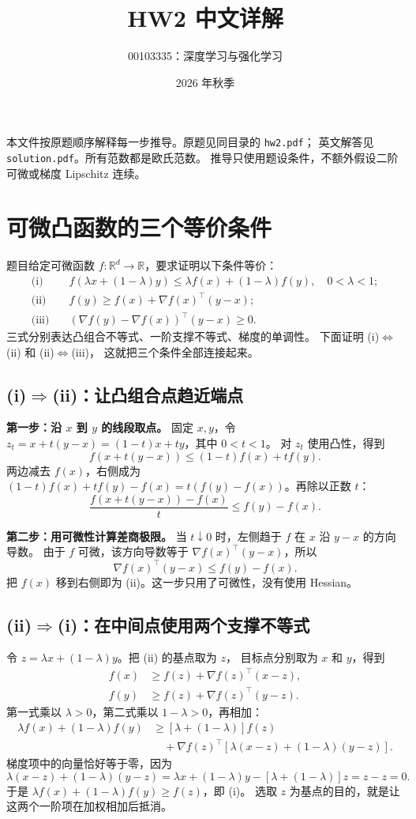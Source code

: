 \documentclass[UTF8,a4paper,11pt,fontset=fandol]{ctexart}
\title{HW2 中文详解}
\author{00103335：深度学习与强化学习}
\date{2026 年秋季}
\newcommand{\R}{\mathbb R}
\begin{document}
\pagestyle{plain}
\maketitle
本文件按原题顺序解释每一步推导。原题见同目录的 \texttt{hw2.pdf}；
英文解答见 \texttt{solution.pdf}。所有范数都是欧氏范数。
推导只使用题设条件，不额外假设二阶可微或梯度 Lipschitz 连续。

\section{可微凸函数的三个等价条件}
题目给定可微函数 $f:\R^d\to\R$，要求证明以下条件等价：
\begin{align*}
 \text{(i)}\quad&f(\lambda x+(1-\lambda)y)
 \leq\lambda f(x)+(1-\lambda)f(y),\quad0<\lambda<1;\\
 \text{(ii)}\quad&f(y)\geq f(x)+\nabla f(x)^\top(y-x);\\
 \text{(iii)}\quad&(\nabla f(y)-\nabla f(x))^\top(y-x)\geq0.
\end{align*}
三式分别表达凸组合不等式、一阶支撑不等式、梯度的单调性。
下面证明 (i)$\Leftrightarrow$(ii) 和 (ii)$\Leftrightarrow$(iii)，
这就把三个条件全部连接起来。

\subsection*{(i)$\Rightarrow$(ii)：让凸组合点趋近端点}
\textbf{第一步：沿 $x$ 到 $y$ 的线段取点。}
固定 $x,y$，令 $z_t=x+t(y-x)=(1-t)x+ty$，其中 $0<t<1$。
对 $z_t$ 使用凸性，得到
\[
 f(x+t(y-x))\leq(1-t)f(x)+tf(y).
\]
两边减去 $f(x)$，右侧成为
$(1-t)f(x)+tf(y)-f(x)=t(f(y)-f(x))$。再除以正数 $t$：
\[
 \frac{f(x+t(y-x))-f(x)}t\leq f(y)-f(x).
\]

\textbf{第二步：用可微性计算差商极限。}
当 $t\downarrow0$ 时，左侧趋于 $f$ 在 $x$ 沿 $y-x$ 的方向导数。
由于 $f$ 可微，该方向导数等于 $\nabla f(x)^\top(y-x)$，所以
\[
 \nabla f(x)^\top(y-x)\leq f(y)-f(x).
\]
把 $f(x)$ 移到右侧即为 (ii)。这一步只用了可微性，没有使用 Hessian。

\subsection*{(ii)$\Rightarrow$(i)：在中间点使用两个支撑不等式}
令 $z=\lambda x+(1-\lambda)y$。把 (ii) 的基点取为 $z$，
目标点分别取为 $x$ 和 $y$，得到
\begin{align*}
 f(x)&\geq f(z)+\nabla f(z)^\top(x-z),\\
 f(y)&\geq f(z)+\nabla f(z)^\top(y-z).
\end{align*}
第一式乘以 $\lambda>0$，第二式乘以 $1-\lambda>0$，再相加：
\begin{align*}
 \lambda f(x)+(1-\lambda)f(y)
 &\geq[\lambda+(1-\lambda)]f(z)\\
 &\quad+\nabla f(z)^\top[\lambda(x-z)+(1-\lambda)(y-z)].
\end{align*}
梯度项中的向量恰好等于零，因为
\[
 \lambda(x-z)+(1-\lambda)(y-z)
 =\lambda x+(1-\lambda)y-[\lambda+(1-\lambda)]z=z-z=0.
\]
于是 $\lambda f(x)+(1-\lambda)f(y)\geq f(z)$，即 (i)。
选取 $z$ 为基点的目的，就是让这两个一阶项在加权相加后抵消。
\end{document}
